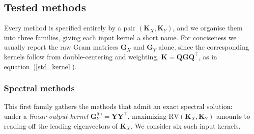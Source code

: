 \documentclass[11pt]{article}
\begin{document}
	\subsection{Tested methods}
	\label{subsec:tested_methods}
	
	Every method is specified entirely by a pair $(\mathbf{K}_X,\mathbf{K}_Y)$, and we
	organise them into three families, giving each input kernel a short name. For
	conciseness we usually report the raw Gram matrices $\mathbf{G}_X$ and
	$\mathbf{G}_Y$ alone, since the corresponding kernels follow from double-centering
	and weighting, $\mathbf{K} = \mathbf{Q}\mathbf{G}\mathbf{Q}^\top$, as in
	equation~(\ref{std_kernel}).
	
	\subsubsection{Spectral methods}
	\label{subsec:tested_spectral}
	
	This first family gathers the methods that admit an exact spectral solution: under
	a \emph{linear output kernel} $\mathbf{G}^\text{lin}_Y = \mathbf{Y}\mathbf{Y}^\top$,
	maximizing $\mathrm{RV}(\mathbf{K}_X,\mathbf{K}_Y)$ amounts to reading off the
	leading eigenvectors of $\mathbf{K}_X$. We consider six such input kernels.
	
\end{document}
